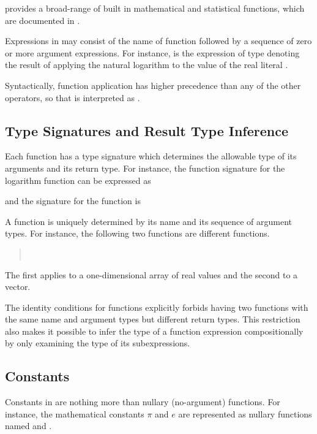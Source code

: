 \Stan provides a broad-range of built in mathematical and statistical
functions, which are documented in .

Expressions in \Stan may consist of the name of function followed by a
sequence of zero or more argument expressions.  For instance,
 is the expression of type  denoting the
result of applying the natural logarithm to the value of the real
literal .

Syntactically, function application has higher precedence than any of
the other operators, so that  is interpreted as
.

\subsection{Type Signatures and Result Type Inference}

Each function has a type signature which determines the allowable type
of its arguments and its return type.  For instance, the function
signature for the logarithm function can be expressed as
%
\begin{quote}
\end{quote}
%
and the signature for the  function is
%
\begin{quote}
\end{quote}
%
A function is uniquely determined by its name and its sequence of
argument types.  For instance, the following two functions are
different functions.
%
\begin{quote}
\\
\end{quote}
%
The first applies to a one-dimensional array of real values and the
second to a vector.

The identity conditions for functions explicitly forbids having two
functions with the same name and argument types but different return
types.  This restriction also makes it possible to infer the type of a
function expression compositionally by only examining the type of its
subexpressions. 

\subsection{Constants}

Constants in \Stan are nothing more than nullary (no-argument)
functions.  For instance, the mathematical constants $\pi$ and $e$ are
represented as nullary functions named  and .

